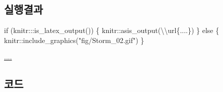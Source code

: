 \documentclass[
  b5paperpaper,
  DIV=11,
  numbers=noendperiod]{scrreprt}
\newenvironment{Shaded}{\begin{snugshade}}{\end{snugshade}}
\newcommand{\ControlFlowTok}[1]{\textcolor[rgb]{0.00,0.23,0.31}{#1}}
\newcommand{\FunctionTok}[1]{\textcolor[rgb]{0.28,0.35,0.67}{#1}}
\newcommand{\NormalTok}[1]{\textcolor[rgb]{0.00,0.23,0.31}{#1}}
\newcommand{\SpecialCharTok}[1]{\textcolor[rgb]{0.37,0.37,0.37}{#1}}
\newcommand{\StringTok}[1]{\textcolor[rgb]{0.13,0.47,0.30}{#1}}
\begin{document}
\hypertarget{uxc2e4uxd589uxacb0uxacfc-29}{%
\subsection{실행결과}\label{uxc2e4uxd589uxacb0uxacfc-29}}

\begin{Shaded}
\begin{Highlighting}[]
\ControlFlowTok{if}\NormalTok{ (knitr}\SpecialCharTok{:::}\FunctionTok{is\_latex\_output}\NormalTok{()) \{}
\NormalTok{  knitr}\SpecialCharTok{::}\FunctionTok{asis\_output}\NormalTok{(}\StringTok{\textquotesingle{}}\SpecialCharTok{\textbackslash{}\textbackslash{}}\StringTok{url\{....\}\textquotesingle{}}\NormalTok{)}
\NormalTok{\} }\ControlFlowTok{else}\NormalTok{ \{}
\NormalTok{  knitr}\SpecialCharTok{::}\FunctionTok{include\_graphics}\NormalTok{(}\StringTok{"fig/Storm\_02.gif"}\NormalTok{)}
\NormalTok{\}}
\end{Highlighting}
\end{Shaded}

\url{....}

\hypertarget{uxcf54uxb4dc-29}{%
\subsection{코드}\label{uxcf54uxb4dc-29}}
\end{document}
